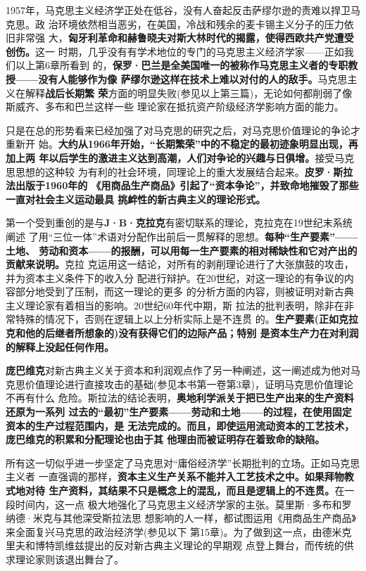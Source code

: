 1957年，马克思主义经济学正处在低谷，没有人奋起反击萨缪尔逊的责难以捍卫马克思。政
治环境依然相当恶劣，在美国，冷战和残余的麦卡锡主义分子的压力依旧非常强
大，\textbf{匈牙利革命和赫鲁晓夫对斯大林时代的揭露，使得西欧共产党遭受创伤。}这一
时期，几乎没有有学术地位的专门的马克思主义经济学家——正如我们以上第6章所看到
的，\textbf{保罗·巴兰是全美国唯一的被称作马克思主义者的专职教授——没有人能够作为像
  萨缪尔逊这样在技术上难以对付的人的敌手。}马克思主义在解释\textbf{战后长期繁
  荣}方面的明显失败(参见以上第三篇)，无论如何都削弱了像斯威齐、多布和巴兰这样一些
理论家在抵抗资产阶级经济学影响方面的能力。

只是在总的形势看来已经加强了对马克思的研究之后，对马克思价值理论的争论才重新开
始。\textbf{大约从1966年开始，“长期繁荣”中的不稳定的最初迹象明显出现，再加上两
  年以后学生的激进主义达到高潮，人们对争论的兴趣与日俱增。}接受马克思思想的这种较
为有利的社会环境，同理论上的重大发展结合起来。\textbf{皮罗·斯拉法出版于1960年的
  《用商品生产商品》引起了“资本争论”，并致命地摧毁了那些一直对社会主义运动最具
  挑衅性的新古典主义的理论形式。}

第一个受到重创的是与\textbf{J·B·克拉克}有密切联系的理论，克拉克在19世纪末系统阐述
了用“三位一体”术语对分配作出前后一贯解释的思想。\textbf{每种“生产要素”——土地、
  劳动和资本——的报酬，可以用每一生产要素的相对稀缺性和它对产出的贡献来说明。}克拉
克运用这一结论，对所有的剥削理论进行了大张旗鼓的攻击，并为资本主义条件下的收入分
配进行辩护。在20世纪，对这一理论的有争议的内容部分地受到了压制，而这一理论的更多
的分析方面的内容，则被证明对新古典主义理论家有着相当的影响。20世纪60年代中期，斯
拉法的批判表明，除非在非常特殊的情况下，否则在逻辑上以上分析实际上是不连贯
的。\textbf{生产要素(正如克拉克和他的后继者所想象的)没有获得它们的边际产品；特别
  是资本生产力在对利润的解释上没起任何作用。}

\textbf{庞巴维克}对新古典主义关于资本和利润观点作了另一种阐述，这一阐述成为他对马
克思价值理论进行直接攻击的基础(参见本书第一卷第3章)，证明马克思价值理论不再有什么
危险。斯拉法的结论表明，\textbf{奥地利学派关于把已生产出来的生产资料还原为一系列
  过去的“最初”生产要素——劳动和土地——的过程，在使用固定资本的生产过程范围内，是
  无法完成的。而且，即使运用流动资本的工艺技术，庞巴维克的积累和分配理论也由于其
  他理由而被证明存在着致命的缺陷。}

所有这一切似乎进一步坚定了马克思对“庸俗经济学”长期批判的立场。正如马克思主义者
一直强调的那样，\textbf{资本主义生产关系不能并入工艺技术之中。如果拜物教式地对待
  生产资料，其结果不只是概念上的混乱，而且是逻辑上的不连贯。}在一段时间内，这一点
极大地强化了马克思主义经济学家的主张。莫里斯·多布和罗纳德·米克与其他深受斯拉法思
想影响的人一样，都试图运用《用商品生产商品》来全面复兴马克思的政治经济学(参见以下
第15章)。为了做到这一点，由德米克里夫和博特凯维兹提出的反对新古典主义理论的早期观
点登上舞台，而传统的供求理论家则该退出舞台了。

